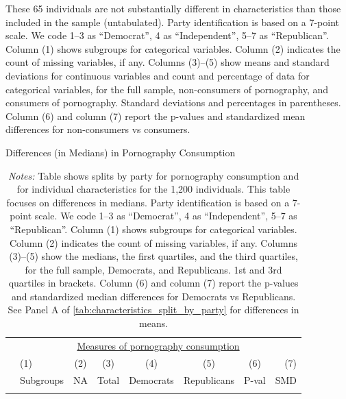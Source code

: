 \documentclass[12pt, letterpaper]{article}
\begin{document}
\begin{table}[ht]
{		These 65 individuals are not substantially different in characteristics than those included in the sample (untabulated).
		Party identification is based on a 7-point scale. We code 1--3 as ``Democrat'', 4 as ``Independent'', 5--7 as ``Republican''.
		Column (1) shows subgroups for categorical variables.
		Column (2) indicates the count of missing variables, if any.
		Columns (3)--(5) show means and standard deviations for continuous variables and count and percentage of data for categorical variables, for the full sample, non-consumers of pornography, and consumers of pornography.
		Standard deviations and percentages in parentheses.
		Column (6) and column (7) report the p-values and standardized mean differences for non-consumers vs consumers.
	}
\end{table}


\begin{table}[ht] \centering \small \setlength\tabcolsep{5 pt}
	\caption{Differences (in Medians) in Pornography Consumption}
	\label{tab:characteristics_split_by_party_medians}
	\begin{adjustbox}{max width=\textwidth}
		\begin{tabular}{@{\hspace{0\tabcolsep}}llrcccrr@{\hspace{0\tabcolsep}}}
			\toprule
			&\multicolumn{7}{c}{\underline{Measures of pornography consumption}}\\
			&\multicolumn{1}{l}{(1)}&\multicolumn{1}{c}{(2)}&\multicolumn{1}{c}{(3)}&\multicolumn{1}{c}{(4)}&\multicolumn{1}{c}{(5)}&\multicolumn{1}{c}{(6)}&\multicolumn{1}{r}{(7)}\\			
			&\multicolumn{1}{l}{Subgroups}&\multicolumn{1}{c}{NA}&\multicolumn{1}{c}{Total}&\multicolumn{1}{c}{Democrats}&\multicolumn{1}{c}{Republicans}&\multicolumn{1}{c}{P-val}&\multicolumn{1}{r}{SMD}\\
			\cmidrule{2-8}
			\\
			\bottomrule
		\end{tabular}
	\end{adjustbox}
	\caption*{\scriptsize \emph{Notes:}
		Table shows splits by party for pornography consumption and for individual characteristics for the 1,200 individuals.
		This table focuses on differences in medians.
		Party identification is based on a 7-point scale. We code 1--3 as ``Democrat'', 4 as ``Independent'', 5--7 as ``Republican''.
		Column (1) shows subgroups for categorical variables.
		Column (2) indicates the count of missing variables, if any.
		Columns (3)--(5) show the medians, the first quartiles, and the third quartiles, for the full sample, Democrats, and Republicans.
		1st and 3rd quartiles in brackets.
		Column (6) and column (7) report the p-values and standardized median differences for Democrats vs Republicans.
		See Panel A of \cref{tab:characteristics_split_by_party} for differences in means.
	}
\end{table}
\end{document}
